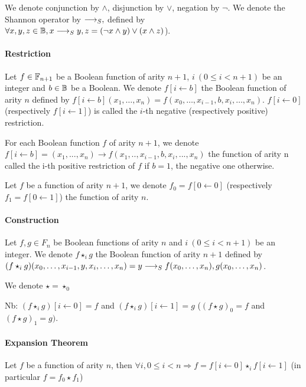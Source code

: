 \documentclass[a4paper,10pt]{article}
\begin{document}
We denote conjunction by $\land$, disjunction by $\lor$, negation by $\lnot$.
We denote the Shannon operator by $\longrightarrow_S ,$ defined by $\forall x, y, z\in\mathbb{B}, x \longrightarrow_S y, z = (\lnot x \land y) \lor (x \land z)$).

\paragraph{Restriction\\}

Let $f\in\mathbb{F}_{n+1}$ be a Boolean function of arity $n+1$, $i~(0\leq i < n+1)$ be an integer and $b\in\mathbb{B}$ be a Boolean.
We denote $f[i\leftarrow b]$ the Boolean function of arity $n$ defined by $f[i\leftarrow b](x_1, \dots, x_n) = f(x_0, \dots, x_{i-1}, b, x_i, \dots, x_n)$.
$f[i\leftarrow 0]$ (respectively $f[i\leftarrow 1]$) is called the $i$-th negative (respectively positive) restriction.

For each Boolean function $f$ of arity $n+1$, we denote $f[i\leftarrow b] = (x_1, ..., x_n) \rightarrow f(x_1, .., x_{i-1}, b, x_i, ..., x_n)$ the function of arity n called the i-th positive restriction of $f$ if $b=1$, the negative one otherwise.


Let $f$ be a function of arity $n+1$, we denote $f_0 = f[0\leftarrow 0]$ (respectively $f_1 = f[0\leftarrow 1]$) the function of arity $n$.

\paragraph{Construction\\}

Let $f, g \in F_n$ be Boolean functions of arity $n$ and $i~(0\leq i < n+1)$ be an integer.
We denote $f\star_ig$ the Boolean function of arity $n+1$ defined by $(f\star_ig)(x_0, \dots, x_{i-1}, y, x_i, \dots, x_n) = y \longrightarrow_S f(x_0, \dots, x_n), g(x_0, \dots, x_n)$.

We denote $\star = \star_0$

Nb: $(f\star_i g)[i\leftarrow 0] = f$ and $ (f\star_i g)[i\leftarrow 1] = g$ ($(f\star g)_0 = f$ and $ (f\star g)_1 = g)$.

\paragraph{Expansion Theorem\\}
Let $f$ be a function of arity $n$, then $\forall i, 0\leq i < n \Rightarrow f = f[i\leftarrow 0]\star_i f[i\leftarrow 1]$ (in particular $f = f_0 \star f_1$)
\end{document}
